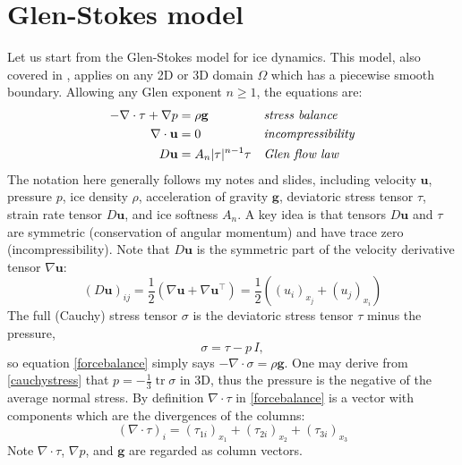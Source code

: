 \documentclass[letterpaper,final,12pt,reqno]{amsart}
\newcommand{\grad}{\nabla}
\newcommand{\Div}{\nabla\cdot}
\newcommand{\trace}{\operatorname{tr}}
\newcommand{\bg}{\mathbf{g}}
\newcommand{\bu}{\mathbf{u}}
\begin{document}
\section{Glen-Stokes model} \label{sec:stokes}

Let us start from the Glen-Stokes model for ice dynamics.  This model, also covered in \cite{GreveBlatter2009,JouvetRappaz2011}, applies on any 2D or 3D domain $\Omega$ which has a piecewise smooth boundary.  Allowing any Glen exponent $n\ge 1$, the equations are:
\begin{align}
- \nabla \cdot \tau + \nabla p &= \rho \bg &&\text{\emph{stress balance}} \label{forcebalance} \\
\nabla \cdot \bu &= 0 &&\text{\emph{incompressibility}} \label{incompressible} \\
D\bu &= A_n |\tau|^{n-1} \tau &&\text{\emph{Glen flow law}} \label{flowlaw}
\end{align}
The notation here generally follows my notes and slides, including velocity $\bu$, pressure $p$, ice density $\rho$, acceleration of gravity $\bg$, deviatoric stress tensor $\tau$, strain rate tensor $D\bu$, and ice softness $A_n$.  A key idea is that tensors $D\bu$ and $\tau$ are symmetric (conservation of angular momentum) and have trace zero (incompressibility).  Note that $D\bu$ is the symmetric part of the velocity derivative tensor $\grad \bu$:
\begin{equation}
(D\bu)_{ij} = \frac{1}{2} \left(\grad\bu + \grad\bu^\top\right) = \frac{1}{2} \left((u_i)_{x_j} + (u_j)_{x_i}\right) \label{strainrate}
\end{equation}
The full (Cauchy) stress tensor $\sigma$ is the deviatoric stress tensor $\tau$ minus the pressure,
\begin{equation}
    \sigma = \tau - p\,I,  \label{cauchystress}
\end{equation}
so equation \eqref{forcebalance} simply says $-\Div \sigma = \rho \bg$.  One may derive from \eqref{cauchystress} that $p = -\frac{1}{3} \trace \sigma$ in 3D, thus the pressure is the negative of the average normal stress.  By definition $\Div\tau$ in \eqref{forcebalance} is a vector with components which are the divergences of the columns:
\begin{equation}
    \left(\nabla \cdot \tau\right)_i = \left(\tau_{1i}\right)_{x_1} + \left(\tau_{2i}\right)_{x_2} + \left(\tau_{3i}\right)_{x_3}  \label{divtaudefn}
\end{equation}
Note $\nabla\cdot \tau$, $\nabla p$, and $\bg$ are regarded as column vectors.
\end{document}
